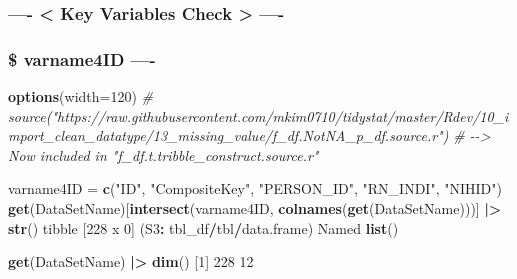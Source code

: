 \documentclass[
]{article}
\newenvironment{Shaded}{\begin{snugshade}}{\end{snugshade}}
\newcommand{\AttributeTok}[1]{\textcolor[rgb]{0.13,0.29,0.53}{#1}}
\newcommand{\CommentTok}[1]{\textcolor[rgb]{0.56,0.35,0.01}{\textit{#1}}}
\newcommand{\DecValTok}[1]{\textcolor[rgb]{0.00,0.00,0.81}{#1}}
\newcommand{\FunctionTok}[1]{\textcolor[rgb]{0.13,0.29,0.53}{\textbf{#1}}}
\newcommand{\NormalTok}[1]{#1}
\newcommand{\OtherTok}[1]{\textcolor[rgb]{0.56,0.35,0.01}{#1}}
\newcommand{\SpecialCharTok}[1]{\textcolor[rgb]{0.81,0.36,0.00}{\textbf{#1}}}
\newcommand{\StringTok}[1]{\textcolor[rgb]{0.31,0.60,0.02}{#1}}
\begin{document}
\begin{Shaded}
\begin{Highlighting}[]
\end{Highlighting}
\end{Shaded}

\hypertarget{key-variables-check--}{%
\subsubsection{---- \textless{} Key Variables Check \textgreater{}
----}\label{key-variables-check--}}

\hypertarget{varname4id--}{%
\subsubsection{\$ varname4ID ----}\label{varname4id--}}

\begin{Shaded}
\begin{Highlighting}[]
\FunctionTok{options}\NormalTok{(}\AttributeTok{width=}\DecValTok{120}\NormalTok{)}
\CommentTok{\# source("https://raw.githubusercontent.com/mkim0710/tidystat/master/Rdev/10\_import\_clean\_datatype/13\_missing\_value/f\_df.NotNA\_p\_df.source.r")}
\CommentTok{\# {-}{-}\textgreater{} Now included in "f\_df.t.tribble\_construct.source.r"}
  
\NormalTok{varname4ID }\OtherTok{=} \FunctionTok{c}\NormalTok{(}\StringTok{"ID"}\NormalTok{, }\StringTok{"CompositeKey"}\NormalTok{, }\StringTok{"PERSON\_ID"}\NormalTok{, }\StringTok{"RN\_INDI"}\NormalTok{, }\StringTok{"NIHID"}\NormalTok{)}
\FunctionTok{get}\NormalTok{(DataSetName)[}\FunctionTok{intersect}\NormalTok{(varname4ID, }\FunctionTok{colnames}\NormalTok{(}\FunctionTok{get}\NormalTok{(DataSetName)))] }\SpecialCharTok{|\textgreater{}} \FunctionTok{str}\NormalTok{()}
\NormalTok{tibble [}\DecValTok{228}\NormalTok{ x }\DecValTok{0}\NormalTok{] (S3}\SpecialCharTok{:}\NormalTok{ tbl\_df}\SpecialCharTok{/}\NormalTok{tbl}\SpecialCharTok{/}\NormalTok{data.frame)}
\NormalTok{ Named }\FunctionTok{list}\NormalTok{()}
\end{Highlighting}
\end{Shaded}

\begin{Shaded}
\begin{Highlighting}[]
\FunctionTok{get}\NormalTok{(DataSetName) }\SpecialCharTok{|\textgreater{}} \FunctionTok{dim}\NormalTok{()}
\NormalTok{[}\DecValTok{1}\NormalTok{] }\DecValTok{228}  \DecValTok{12}
\end{Highlighting}
\end{Shaded}
\end{document}

